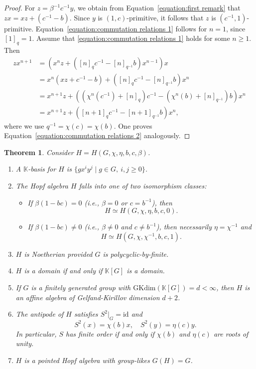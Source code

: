 \documentclass[11pt, twoside]{amsart}
\newtheorem{theorem}{Theorem}[section]
\theoremstyle{definition}
\newcommand{\KK}{\mathbb{K}}
\begin{document}
\begin{proof}
    For $z = \beta^{-1}c^{-1}y$, we obtain from Equation~\eqref{equation:first remark} that $zx = xz + (c^{-1} - b)$. Since $y$ is $(1,c)$-primitive, it follows that $z$ is $(c^{-1}, 1)$-primitive. Equation~\eqref{equation:commutation relations 1} follows for $n=1$, since $[1]_q=1$.  Assume that \eqref{equation:commutation relations 1} holds for some $n \geq 1$. Then
    \begin{align*}
        zx^{n+1}    & =  \left( x^nz + \left( [n]_q c^{-1} - [n]_{q^{-1}} b \right)x^{n-1}\right) x\\
                    & = x^n (xz+c^{-1}-b) + \left( [n]_q c^{-1} - [n]_{q^{-1}} b \right)x^{n}\\
                    & = x^{n+1}z +\left(\left(\chi^{n}(c^{-1}) + [n]_q\right)c^{-1}  - \left(\chi^n(b) + [n]_{q^{-1}}\right)b\right) x^n\\
                    & = x^{n+1}z +\left( [n+1]_q c^{-1}  - [n+1]_{q^{-1}} b\right) x^n,
    \end{align*}
    where we use $q^{-1}=\chi(c) = \chi(b)$.
    One proves Equation~\eqref{equation:commutation relations 2} analogously.
\end{proof}

\begin{theorem}\label{theorem:properties of H}
    Consider $H = H(G, \chi, \eta, b, c, \beta)$. 
    \begin{enumerate}
        \item A $\KK$-basis for $H$ is $\{gx^i y^j \mid g \in G,\ i, j \geq 0\}$.
        \item The Hopf algebra $H$ falls into one of two isomorphism classes:
        \begin{itemize}
            \item If $\beta(1-bc) = 0$ (i.e., $\beta = 0$ or $c = b^{-1}$), then 
            \[H \simeq H(G, \chi, \eta, b, c, 0).\]
            \item If $\beta(1-bc) \neq 0$ (i.e., $\beta \neq 0$ and $c \neq b^{-1}$), then necessarily $\eta = \chi^{-1}$ and 
            \[H \simeq H(G, \chi, \chi^{-1}, b, c, 1).\]
        \end{itemize}
        \item $H$ is Noetherian provided $G$ is polycyclic-by-finite.
        \item $H$ is a domain if and only if $\KK[G]$ is a domain.
        \item If $G$ is a finitely generated group with $\mathrm{GKdim}(\KK[G]) = d < \infty$, then $H$ is an affine algebra of Gelfand-Kirillov dimension $d + 2$.
        \item The antipode of $H$ satisfies $S^{2}|_G = \mathrm{id}$ and 
        \[S^{2}(x) = \chi(b)x, \quad S^{2}(y) = \eta(c)y.\]
        In particular, $S$ has finite order if and only if $\chi(b)$ and $\eta(c)$ are roots of unity.
        \item $H$ is a pointed Hopf algebra with group-likes $G(H) = G$.
    \end{enumerate}
\end{theorem}
\end{document}
